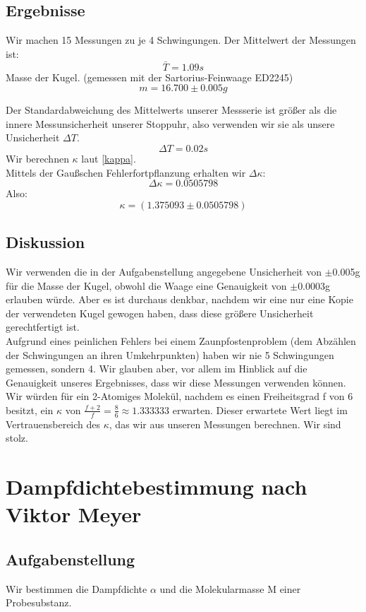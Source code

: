 \documentclass{article}
\begin{document}
\subsection{Ergebnisse}
Wir machen 15 Messungen zu je 4 Schwingungen. Der Mittelwert der Messungen ist:\\
$$\bar{T}=1.09s$$
Masse der Kugel. (gemessen mit der Sartorius-Feinwaage ED2245)\\
$$m=16.700\pm0.005g$$

Der Standardabweichung des Mittelwerts unserer Messserie ist größer als die innere Messunsicherheit unserer Stoppuhr, also verwenden wir sie als unsere Unsicherheit $\Delta T$.
$$\Delta T=0.02s$$
Wir  berechnen $\kappa$ laut \ref{kappa}. \\
Mittels der Gaußschen Fehlerfortpflanzung erhalten wir $\Delta\kappa$:
$$\Delta\kappa=0.0505798$$
Also:
$$\boxed{\kappa=(1.375093 \pm 0.0505798)} $$

\subsection{Diskussion}
Wir verwenden die in der Aufgabenstellung angegebene Unsicherheit von $\pm$0.005g für die Masse der Kugel, obwohl die Waage eine Genauigkeit von $\pm$0.0003g erlauben würde. Aber es ist durchaus denkbar, nachdem wir eine nur eine Kopie der verwendeten Kugel gewogen haben, dass diese größere Unsicherheit gerechtfertigt ist. \\ 
Aufgrund eines peinlichen Fehlers bei einem Zaunpfostenproblem (dem Abzählen der Schwingungen an ihren Umkehrpunkten) haben wir nie 5 Schwingungen gemessen, sondern 4. Wir glauben aber, vor allem im Hinblick auf die Genauigkeit unseres Ergebnisses, dass wir diese Messungen verwenden können. \\ 
Wir würden für ein 2-Atomiges Molekül, nachdem es einen Freiheitsgrad f von 6 besitzt, ein $\kappa$ von $\frac{f+2}{f}=\frac{8}{6}\approx1.333333$ erwarten. Dieser erwartete Wert liegt im Vertrauensbereich des $\kappa$, das wir aus unseren Messungen berechnen. Wir sind stolz.
\newpage
\section{Dampfdichtebestimmung nach Viktor Meyer}
\subsection{Aufgabenstellung}
Wir bestimmen die Dampfdichte $\alpha$ und die Molekularmasse M einer Probesubstanz. 
\end{document}
